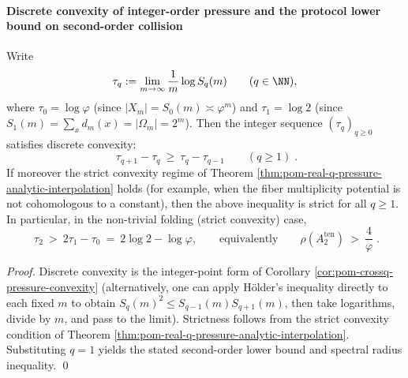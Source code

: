 \paragraph{Discrete convexity of integer-order pressure and the protocol lower bound on second-order collision}
\begin{corollary}\label{cor:pom-integer-pressure-discrete-convexity-strict-bound}
Write
\[
\tau_q:=\lim_{m\to\infty}\frac{1}{m}\log S_q(m)
\qquad(q\in\NN),
\]
where \(\tau_0=\log\varphi\) (since \(|X_m|=S_0(m)\asymp \varphi^m\)) and \(\tau_1=\log 2\) (since \(S_1(m)=\sum_x d_m(x)=|\Omega_m|=2^m\)).
Then the integer sequence \((\tau_q)_{q\ge 0}\) satisfies discrete convexity:
\[
\boxed{\;
\tau_{q+1}-\tau_q\ \ge\ \tau_q-\tau_{q-1}\qquad(q\ge 1)\; }.
\]
If moreover the strict convexity regime of Theorem \ref{thm:pom-real-q-pressure-analytic-interpolation} holds (for example, when the fiber multiplicity potential is not cohomologous to a constant), then the above inequality is strict for all \(q\ge 1\).
In particular, in the non-trivial folding (strict convexity) case,
\[
\boxed{\;
\tau_2\ >\ 2\tau_1-\tau_0\ =\ 2\log 2-\log\varphi,
\qquad\text{equivalently}\qquad
\rho\!\left(A_2^{\mathrm{ten}}\right)\ >\ \frac{4}{\varphi}\; }.
\]
\end{corollary}
\begin{proof}
Discrete convexity is the integer-point form of Corollary \ref{cor:pom-crossq-pressure-convexity} (alternatively, one can apply H\"older's inequality directly to each fixed \(m\) to obtain \(S_q(m)^2\le S_{q-1}(m)S_{q+1}(m)\), then take logarithms, divide by \(m\), and pass to the limit).
Strictness follows from the strict convexity condition of Theorem \ref{thm:pom-real-q-pressure-analytic-interpolation}.
Substituting \(q=1\) yields the stated second-order lower bound and spectral radius inequality. \qed
\end{proof}

